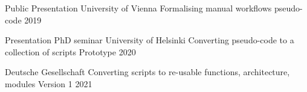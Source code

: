 \begin{cvpubs}
\end{cvpubs}

\begin{cvpubs}
\end{cvpubs}

{Public Presentation University of Vienna} %
    {Formalising manual workflows} %
    {pseudo-code} %
    {2019} %
    
    \cvhonor
    {Presentation PhD seminar University of Helsinki} %
    {Converting pseudo-code to a collection of scripts} %
    {Prototype} %
    {2020} %

    \cvhonor
    {Deutsche Gesellschaft} %
    {Converting scripts to re-usable functions, architecture, modules} %
    {Version 1} %
    {2021} %